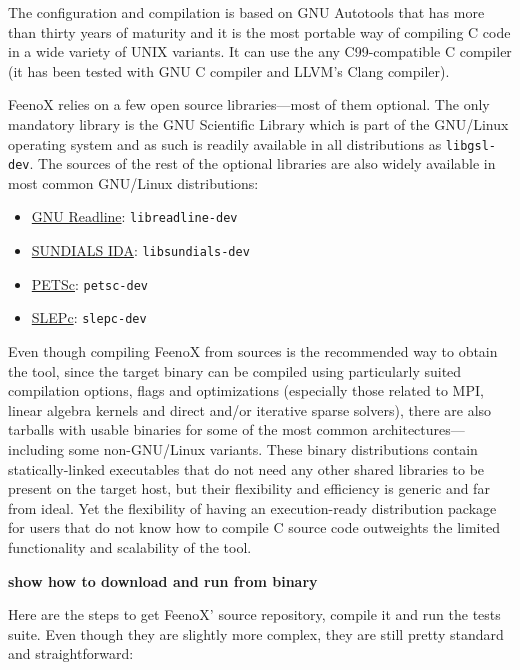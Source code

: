 \documentclass[
  american,
]{article}
\providecommand{\tightlist}{%
  \setlength{\itemsep}{0pt}\setlength{\parskip}{0pt}}
\begin{document}
The configuration and compilation is based on GNU Autotools that has
more than thirty years of maturity and it is the most portable way of
compiling C code in a wide variety of UNIX variants. It can use the any
C99-compatible C compiler (it has been tested with GNU C compiler and
LLVM's Clang compiler).

FeenoX relies on a few open source libraries---most of them optional.
The only mandatory library is the GNU Scientific Library which is part
of the GNU/Linux operating system and as such is readily available in
all distributions as \passthrough{\lstinline!libgsl-dev!}. The sources
of the rest of the optional libraries are also widely available in most
common GNU/Linux distributions:

\begin{itemize}
\tightlist
\item
  \href{https://tiswww.case.edu/php/chet/readline/rltop.html}{GNU
  Readline}: \passthrough{\lstinline!libreadline-dev!}
\item
  \href{https://computing.llnl.gov/projects/sundials/ida}{SUNDIALS IDA}:
  \passthrough{\lstinline!libsundials-dev!}
\item
  \href{https://www.mcs.anl.gov/petsc/}{PETSc}:
  \passthrough{\lstinline!petsc-dev!}
\item
  \href{https://slepc.upv.es/}{SLEPc}:
  \passthrough{\lstinline!slepc-dev!}
\end{itemize}

Even though compiling FeenoX from sources is the recommended way to
obtain the tool, since the target binary can be compiled using
particularly suited compilation options, flags and optimizations
(especially those related to MPI, linear algebra kernels and direct
and/or iterative sparse solvers), there are also tarballs with usable
binaries for some of the most common architectures---including some
non-GNU/Linux variants. These binary distributions contain
statically-linked executables that do not need any other shared
libraries to be present on the target host, but their flexibility and
efficiency is generic and far from ideal. Yet the flexibility of having
an execution-ready distribution package for users that do not know how
to compile C source code outweights the limited functionality and
scalability of the tool.

\textbf{show how to download and run from binary}

Here are the steps to get FeenoX' source repository, compile it and run
the tests suite. Even though they are slightly more complex, they are
still pretty standard and straightforward:
\end{document}

